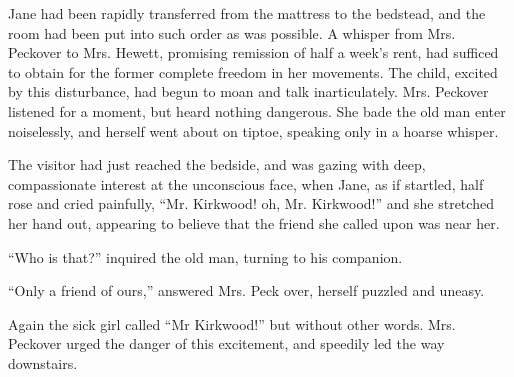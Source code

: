 Jane had been rapidly transferred from the mattress to the bedstead, and
the room had been put into such order as was possible. A whisper from
Mrs. Peckover to Mrs. Hewett, promising remission of half a week's rent,
had sufficed to obtain for the former complete freedom in her movements.
The child, excited by this disturbance, had begun to moan and talk
inarticulately. Mrs. Peckover listened for a moment, but heard nothing
dangerous. She bade the old man enter noiselessly, and herself went
about on tiptoe, speaking only in a hoarse whisper.

The visitor had just reached the bedside, and was gazing with deep,
compassionate interest at the unconscious face, when Jane, as if
startled, half rose and cried painfully, ``Mr. Kirkwood! oh, Mr.
Kirkwood!'' and she stretched her hand out, appearing to believe that
the friend she called upon was near her.

{\protect\hypertarget{118}{}{}}``Who is that?'' inquired the old man,
turning to his companion.

``Only a friend of ours,'' answered Mrs. Peck over, herself puzzled and
uneasy.

Again the sick girl called ``Mr Kirkwood!'' but without other words.
Mrs. Peckover urged the danger of this excitement, and speedily led the
way downstairs.
